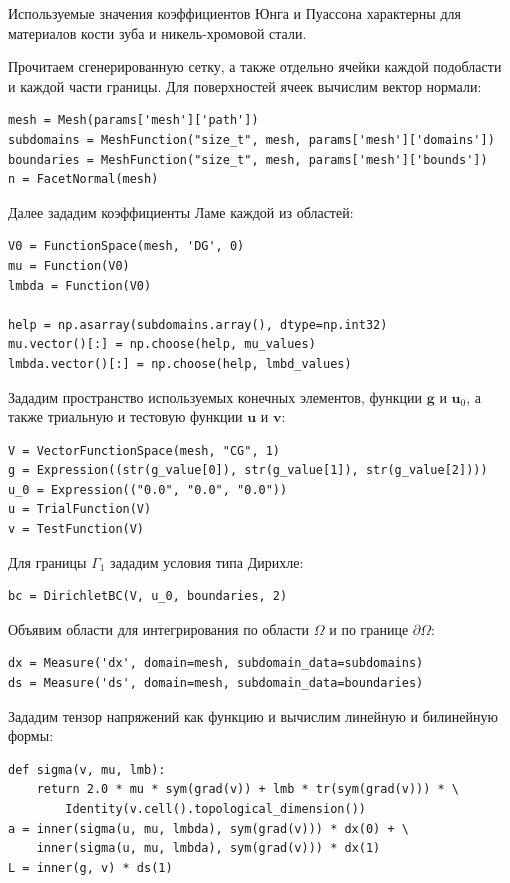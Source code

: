 \documentclass[a4paper, 14pt]{extreport}
\begin{document}
Используемые значения коэффициентов Юнга и Пуассона характерны для
 материалов кости зуба и никель-хромовой стали.

Прочитаем сгенерированную сетку, а также отдельно ячейки каждой подобласти
и каждой части границы. Для поверхностей ячеек вычислим вектор нормали:
\begin{lstlisting}
mesh = Mesh(params['mesh']['path'])
subdomains = MeshFunction("size_t", mesh, params['mesh']['domains'])
boundaries = MeshFunction("size_t", mesh, params['mesh']['bounds'])
n = FacetNormal(mesh)
\end{lstlisting}

Далее зададим коэффициенты Ламе каждой из областей:
\begin{lstlisting}
V0 = FunctionSpace(mesh, 'DG', 0)
mu = Function(V0)
lmbda = Function(V0)

help = np.asarray(subdomains.array(), dtype=np.int32)
mu.vector()[:] = np.choose(help, mu_values)
lmbda.vector()[:] = np.choose(help, lmbd_values)
\end{lstlisting}

Зададим пространство используемых конечных элементов,
функции $\textbf{g}$ и $\textbf{u}_0$, а также триальную и тестовую
функции $\textbf{u}$ и $\textbf{v}$:
\begin{lstlisting}
V = VectorFunctionSpace(mesh, "CG", 1)
g = Expression((str(g_value[0]), str(g_value[1]), str(g_value[2])))
u_0 = Expression(("0.0", "0.0", "0.0"))
u = TrialFunction(V)
v = TestFunction(V)
\end{lstlisting}

Для границы $\Gamma_1$ зададим условия типа Дирихле:
\begin{lstlisting}
bc = DirichletBC(V, u_0, boundaries, 2)
\end{lstlisting}

Объявим области для интегрирования по области $\Omega$ и по границе
$\partial\Omega$:
\begin{lstlisting}
dx = Measure('dx', domain=mesh, subdomain_data=subdomains)
ds = Measure('ds', domain=mesh, subdomain_data=boundaries)
\end{lstlisting}

Зададим тензор напряжений как функцию и вычислим линейную и билинейную формы:
\begin{lstlisting}
def sigma(v, mu, lmb):
    return 2.0 * mu * sym(grad(v)) + lmb * tr(sym(grad(v))) * \
        Identity(v.cell().topological_dimension())
a = inner(sigma(u, mu, lmbda), sym(grad(v))) * dx(0) + \
    inner(sigma(u, mu, lmbda), sym(grad(v))) * dx(1)
L = inner(g, v) * ds(1)
\end{lstlisting}
\end{document}

